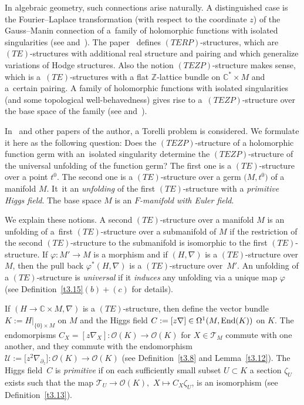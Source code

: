 \documentclass[pdftex]{sigma}%
\numberwithin{equation}{section}
\numberwithin{figure}{section}
\newcommand{\Z}{{\mathbb Z}}
\newcommand{\C}{{\mathbb C}}
\newcommand{\OO}{{\mathcal O}}
\newcommand{\TT}{{\mathcal T}}
\newcommand{\UU}{{\mathcal U}}
\newcommand{\paa}{\partial}
\newcommand{\nnn}{\nabla}
\begin{document}
In algebraic geometry, such connections arise naturally.
A distinguished case is the Fourier--Laplace transformation
(with respect to the coordinate $z$)
of the Gauss--Manin connection of a~family of
holomorphic functions with isolated singularities
(see \cite[Chapter~8]{He03} and~\cite[Chapter~VII]{Sa02}). The paper~\cite{He03}
defines $(TERP)$-structures, which are $(TE)$-structures
with additional real structure and pairing
and which generalize variations of Hodge structures.
Also the notion $(TEZP)$-structure makes sense, which is a~$(TE)$-structures with a flat $\Z$-lattice bundle
on $\C^*\times M$ and a~certain pairing.
A family of holomorphic functions with isolated singularities
(and some topological well-behavedness) gives rise to a~$(TEZP)$-structure over the base space of the family
(see \cite[Chapter~11.4]{He02} and~\cite[Chapter~8]{He03}).

In~\cite{He02} and other papers of the author,
a Torelli problem is considered.
We formulate it here as the following question:
Does the $(TEZP)$-structure of a holomorphic function germ with
an~isolated singularity determine the $(TEZP)$-structure
of the universal unfolding of the function germ?
The first one is a $(TE)$-structure over a point $t^0$.
The second one is a $(TE)$-structure over a germ
$\big(M,t^0\big)$ of a manifold $M$. It~it an {\it unfolding}
of the first $(TE)$-structure with a {\it primitive
Higgs field}. The base space $M$ is an
{\it $F$-manifold with Euler field}.

We explain these notions. A second $(TE)$-structure over
a manifold $M$ is an unfolding of a~first $(TE)$-structure
over a submanifold of $M$ if the restriction of the second
$(TE)$-structure to the submanifold
is isomorphic to the first $(TE)$-structure.
If $\varphi\colon M'\to M$ is a morphism
and if $(H,\nnn)$ is a $(TE)$-structure over $M$,
then the pull back $\varphi^*(H,\nnn)$ is a $(TE)$-structure
over~$M'$. An unfolding of a $(TE)$-structure
is {\it universal} if it {\it induces}
any unfolding via a unique map $\varphi$
(see Definition~\ref{t3.15}$(b){+}(c)$ for details).

If $(H\to\C\times M,\nnn)$ is a $(TE)$-structure, then
define the vector bundle $K:=H|_{\{0\}\times M}$ on $M$
and the Higgs field
$C:=[z\nnn]\in \Omega^1(M,{\rm End}(K))$ on $K$.
The endomorpisms $C_X=[z\nnn_X]\colon \OO(K)\to\OO(K)$ for
$X\in \TT_M$ commute with one another,
and they commute with the
endomorphism $\UU:=\big[z^2\nnn_{\paa_z}\big]\colon \OO(K)\to\OO(K)$
(see Definition~\ref{t3.8} and Lemma~\ref{t3.12}).
The Higgs field~$C$ is {\it primitive} if on each sufficiently
small subset $U\subset K$ a section $\zeta_U$ exists such
that the map $\TT_U\to \OO(K),$ $X\mapsto C_X\zeta_U$, is
an isomorphism (see Definition~\ref{t3.13}).
\end{document}
